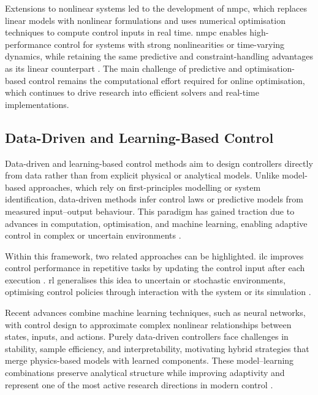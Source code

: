Extensions to nonlinear systems led to the development of \gls{nmpc}, which replaces linear models with nonlinear formulations and uses numerical optimisation techniques to compute control inputs in real time. 
\gls{nmpc} enables high-performance control for systems with strong nonlinearities or time-varying dynamics, while retaining the same predictive and constraint-handling advantages as its linear counterpart \cite{gruneNonlinearModelPredictive2011,rawlingsModelPredictiveControl2020}.  
The main challenge of predictive and optimisation-based control remains the computational effort required for online optimisation, which continues to drive research into efficient solvers and real-time implementations.

\subsection{Data-Driven and Learning-Based Control}

Data-driven and learning-based control methods aim to design controllers directly from data rather than from explicit physical or analytical models.
Unlike model-based approaches, which rely on first-principles modelling or system identification, data-driven methods infer control laws or predictive models from measured input--output behaviour.
This paradigm has gained traction due to advances in computation, optimisation, and machine learning, enabling adaptive control in complex or uncertain environments \cite{houModelbasedControlDatadriven2013,rechtTourReinforcementLearning2019}.

Within this framework, two related approaches can be highlighted. 
\gls{ilc} improves control performance in repetitive tasks by updating the control input after each execution \cite{bristowSurveyIterativeLearning2006}. 
\gls{rl} generalises this idea to uncertain or stochastic environments, optimising control policies through interaction with the system or its simulation \cite{suttonReinforcementLearningIntroduction2018,rechtTourReinforcementLearning2019}.

Recent advances combine machine learning techniques, such as neural networks, with control design to approximate complex nonlinear relationships between states, inputs, and actions. 
Purely data-driven controllers face challenges in stability, sample efficiency, and interpretability, motivating hybrid strategies that merge physics-based models with learned components. 
These model--learning combinations preserve analytical structure while improving adaptivity and represent one of the most active research directions in modern control \cite{kordaLinearPredictorsNonlinear2018,houModelbasedControlDatadriven2013}.


